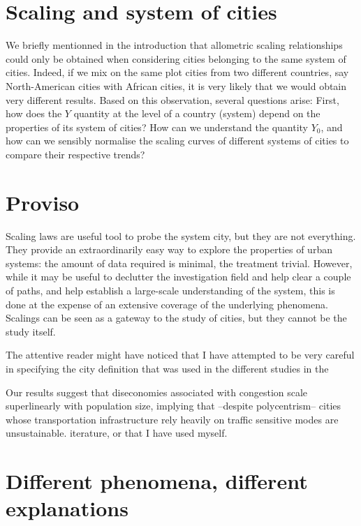 \section{Scaling and system of cities}
\label{sec:scaling_and_system_of_cities}

We briefly mentionned in the introduction that allometric scaling relationships
could only be obtained when considering cities belonging to the same system of
cities. Indeed, if we mix on the same plot cities from two different countries,
say North-American cities with African cities, it is very likely that we would
obtain very different results. Based on this observation, several questions
arise: First, how does the $Y$ quantity at the level of a country (system)
depend on the properties of its system of cities? How can we understand the
quantity $Y_0$, and how can we sensibly normalise the scaling curves of
different systems of cities to compare their respective trends?

\section{Proviso}
\label{sec:poviso}

Scaling laws are useful tool to probe the system city, but they are not
everything. They provide an extraordinarily easy way to explore the properties
of urban systems: the amount of data required is minimal, the treatment
trivial. However, while it may be useful to declutter the investigation field
and help clear a couple of paths, and help establish a large-scale understanding
of the system, this is done at the expense of an extensive coverage of the
underlying phenomena. Scalings can be seen as a gateway to the study of cities,
but they cannot be the study itself.

The attentive reader might have noticed that I have attempted to be very careful
in specifying the city definition that was used in the different studies in the

Our results
suggest that diseconomies associated with congestion scale superlinearly with
population size, implying that --despite polycentrism-- cities whose
transportation infrastructure rely heavily on traffic sensitive modes are
unsustainable.
iterature, or that I have used myself.

\section{Different phenomena, different explanations}
\label{sec:different_phenomena_different_explanations}
    
